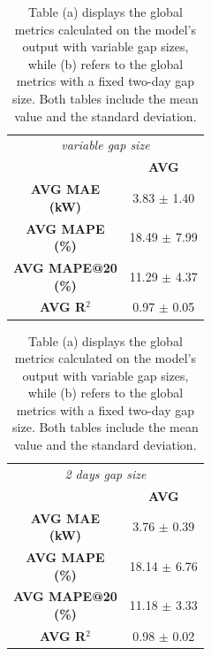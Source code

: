 \begin{table}[H]

	\begin{minipage}{.5\textwidth}
		\centering
		\begin{tabular}{c|c}
			\multicolumn{2}{c}{\textit{variable gap size}}        \\
			                   & \multicolumn{1}{c}{\textbf{AVG}} \\
			\hline
			\makecell{\textbf{AVG MAE}                            \\\textbf{(kW)}}& 3.83 $\pm$ 1.40\\
			\makecell{\textbf{AVG MAPE}                           \\\textbf{(\%)}}& 18.49 $\pm$ 7.99\\
			\makecell{\textbf{AVG MAPE@20}                        \\\textbf{(\%)}}& 11.29 $\pm$ 4.37\\
			\textbf{AVG R$^2$} & 0.97 $\pm$ 0.05
		\end{tabular}
		\caption*{(a)}
	\end{minipage}%
	\begin{minipage}{.5\textwidth}
		\centering
		\begin{tabular}{c|c}
			\multicolumn{2}{c}{\textit{2 days gap size}}          \\
			                   & \multicolumn{1}{c}{\textbf{AVG}} \\
			\hline
			\makecell{\textbf{AVG MAE}                            \\\textbf{(kW)}}& 3.76 $\pm$ 0.39\\
			\makecell{\textbf{AVG MAPE}                           \\\textbf{(\%)}}& 18.14 $\pm$ 6.76\\
			\makecell{\textbf{AVG MAPE@20}                        \\\textbf{(\%)}}& 11.18 $\pm$ 3.33\\
			\textbf{AVG R$^2$} & 0.98 $\pm$ 0.02
		\end{tabular}
		\caption*{(b)}
	\end{minipage}%
	\caption{Table (a) displays the global metrics calculated on the model's output with variable gap sizes, while (b) refers to the global metrics with a fixed two-day gap size. Both tables include the mean value and the standard deviation.}
	\label{tab:gabglobalmetrics}
\end{table}

